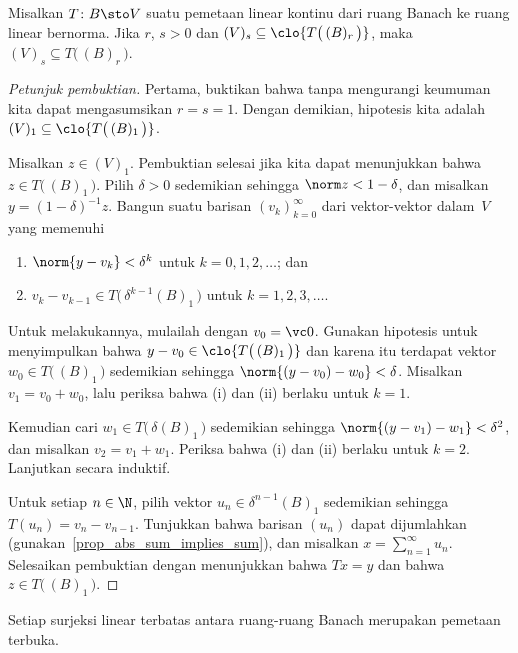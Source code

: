 \begin{prop}\label{prop_for_OMT} Misalkan $T\colon B \sto V$ suatu pemetaan linear kontinu dari ruang Banach ke ruang linear bernorma.
Jika $r$, $s > 0$ dan $(V)_s \subseteq \clo{T\bigl(\,(B)_r\,\bigr)}$, maka $(V)_s \subseteq T\bigl(\,(B)_r\,\bigr)$.
\end{prop}

\begin{proof}[\emph{Petunjuk pembuktian}] Pertama, buktikan bahwa tanpa mengurangi keumuman kita dapat mengasumsikan $r = s = 1$.  Dengan demikian,
hipotesis kita adalah $(V)_1 \subseteq \clo{T\bigl(\,(B)_1\,\bigr)}$.

Misalkan $z \in (V)_1$.  Pembuktian selesai jika kita dapat menunjukkan bahwa $z \in T\bigl(\,(B)_1\,\bigr)$.  Pilih $\delta > 0$ sedemikian
sehingga $\norm z < 1 - \delta$, dan misalkan $y = (1 - \delta)^{-1}z$.  Bangun suatu barisan $(v_k)_{k=0}^\infty$ dari vektor-vektor dalam~$V$
yang memenuhi
   \begin{enumerate}
     \item[(i)] $\norm{y - v_k} < \delta^k$ untuk $k = 0,1,2,\dots$; dan
     \item[(ii)] $v_k - v_{k-1} \in T\bigl(\,\delta^{k-1}(B)_1\,\bigr)$ untuk $k = 1,2,3,\dots$.
   \end{enumerate}
Untuk melakukannya, mulailah dengan $v_0 = \vc 0$. Gunakan hipotesis untuk menyimpulkan bahwa $y - v_0 \in \clo{T\bigl(\,(B)_1\,\bigr)}$ dan
karena itu terdapat vektor $w_0 \in T\bigl(\,(B)_1\,\bigr)$ sedemikian sehingga $\norm{(y - v_0) - w_0} < \delta$.  Misalkan
$v_1 = v_0 + w_0$, lalu periksa bahwa (i) dan (ii) berlaku untuk $k = 1$.

Kemudian cari $w_1 \in T\bigl(\,\delta (B)_1\,\bigr)$ sedemikian sehingga $\norm{(y - v_1) - w_1} < \delta^2$, dan misalkan $v_2 = v_1 + w_1$.
Periksa bahwa (i) dan (ii) berlaku untuk $k= 2$.  Lanjutkan secara induktif.

Untuk setiap $n \in \N$, pilih vektor $u_n \in \delta^{n-1}(B)_1$ sedemikian sehingga $T(u_n) = v_n - v_{n-1}$. Tunjukkan bahwa barisan
$(u_n)$ dapat dijumlahkan (gunakan~\ref{prop_abs_sum_implies_sum}), dan misalkan $x = \sum_{n=1}^\infty u_n$.  Selesaikan pembuktian dengan menunjukkan
bahwa $Tx = y$ dan bahwa $z \in T\bigl(\,(B)_1\,\bigr)$.   \ns
\end{proof}

\begin{thm}\label{C069414} Setiap surjeksi linear terbatas antara
ruang-ruang Banach merupakan pemetaan terbuka.
\end{thm}

